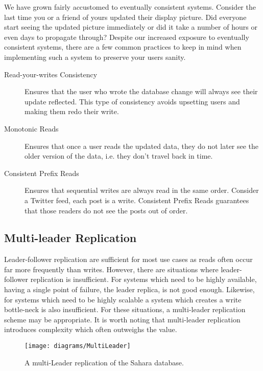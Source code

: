 We have grown fairly accustomed to eventually consistent systems.
Consider the last time you or a friend of yours updated their display picture.
Did everyone start seeing the updated picture immediately or did it take a number of hours or even days to propagate through?
Despite our increased exposure to eventually consistent systems,
there are a few common practices to keep in mind when implementing such a system to preserve your users sanity.

\begin{description}
    \item[Read-your-writes Consistency] Ensures that the user who wrote the database change will always see their update reflected. This type of consistency avoids upsetting users and making them redo their write.
    \item[Monotonic Reads] Ensures that once a user reads the updated data, they do not later see the older version of the data, i.e. they don't travel back in time.
    \item[Consistent Prefix Reads] Ensures that sequential writes are always read in the same order. Consider a Twitter feed, each post is a write. Consistent Prefix Reads guarantees that those readers do not see the posts out of order.
\end{description}

\subsection{Multi-leader Replication}

Leader-follower replication are sufficient for most use cases as reads often occur far more frequently than writes.
However, there are situations where leader-follower replication is insufficient.
For systems which need to be highly available,
having a single point of failure,
the leader replica, is not good enough.
Likewise, for systems which need to be highly scalable a system which creates a write bottle-neck is also insufficient.
For these situations, a multi-leader replication scheme may be appropriate.
It is worth noting that multi-leader replication introduces complexity which often outweighs the value.

\begin{figure}[ht]
    \begin{center}
    \texttt{[image: diagrams/MultiLeader]}
    \end{center}
    \caption{A multi-Leader replication of the Sahara database.}
    \label{fig:sahara-multi-leader}
\end{figure}

